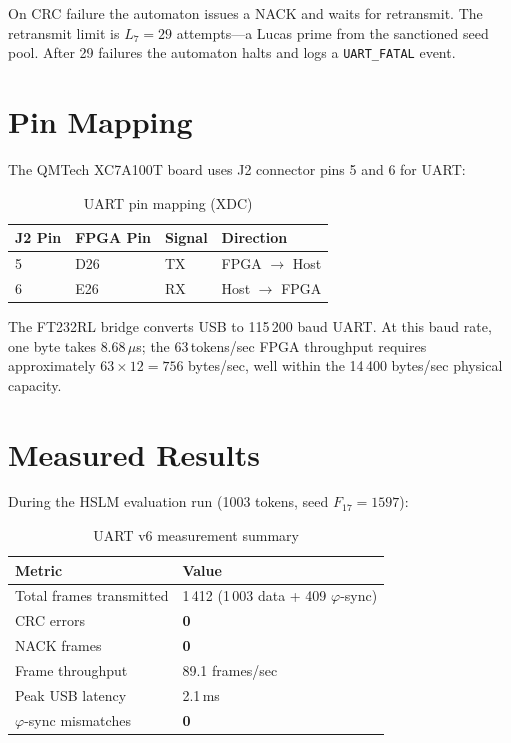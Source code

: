 On CRC failure the automaton issues a NACK and waits for retransmit. The retransmit limit is $L_7 = 29$ attempts---a Lucas prime from the sanctioned seed pool. After 29 failures the automaton halts and logs a \texttt{UART\_FATAL} event.

\section{Pin Mapping}

The QMTech XC7A100T board uses J2 connector pins 5 and 6 for UART:

\begin{table}[h]
\centering
\caption{UART pin mapping (XDC)}
\begin{tabular}{llll}
\toprule
\textbf{J2 Pin} & \textbf{FPGA Pin} & \textbf{Signal} & \textbf{Direction} \\
\midrule
5 & D26 & TX & FPGA $\to$ Host \\
6 & E26 & RX & Host $\to$ FPGA \\
\bottomrule
\end{tabular}
\end{table}

The FT232RL bridge converts USB to 115\,200 baud UART. At this baud rate, one byte takes $8.68\,\mu$s; the 63\,tokens/sec FPGA throughput requires approximately $63 \times 12 = 756$ bytes/sec, well within the 14\,400 bytes/sec physical capacity.

\section{Measured Results}

During the HSLM evaluation run (1003 tokens, seed $F_{17}=1597$):

\begin{table}[h]
\centering
\caption{UART v6 measurement summary}
\begin{tabular}{ll}
\toprule
\textbf{Metric} & \textbf{Value} \\
\midrule
Total frames transmitted & 1\,412 (1\,003 data + 409 $\varphi$-sync) \\
CRC errors               & \textbf{0} \\
NACK frames              & \textbf{0} \\
Frame throughput          & 89.1 frames/sec \\
Peak USB latency          & 2.1\,ms \\
$\varphi$-sync mismatches & \textbf{0} \\
\bottomrule
\end{tabular}
\end{table}

